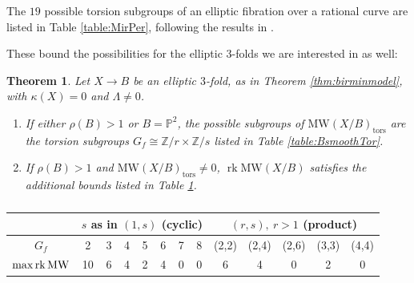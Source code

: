 \documentclass[11pt]{amsart}
\newtheorem{theorem}{Theorem}[section]
\theoremstyle{definition}
\theoremstyle{definition}
\theoremstyle{remark}
\theoremstyle{remark}
\theoremstyle{definition}
\theoremstyle{conjecture}
\newcommand{\MW}{\mathrm{MW}}
\begin{document}
\smallskip
The $19$ possible torsion subgroups 
of an elliptic fibration over a rational curve
are listed in Table \ref{table:MirPer},
following the results in \cite{MirandaPersson1989}.
\begin{table}[h]
\caption{}\label{table:MirPer}
\centering
{}
\end{table}

These bound the possibilities for the elliptic $3$-folds we are interested in as well:

 \begin{theorem}\label{thm:TorsionCY3}
 Let  $X \to B$  be an elliptic $3$-fold, 
 as in Theorem \ref{thm:birminmodel},
 with $\kappa(X)=0$
 and $\Lambda \neq 0$.
 
 \begin{enumerate}
\item If either  \( \rho(B)>1 \) or $B = {\mathbb P}^2$, 
the possible subgroups of $\MW(X/B)_{\mathrm{tors}}$ 
are the torsion subgroups  $ G_f \cong \mathbb{Z}/r \times \mathbb{Z}/s$ listed in Table \ref{table:BsmoothTor}.

\item  If  \( \rho(B)>1 \)  and $\MW(X/B)_{\mathrm{tors}} \neq 0$, $\operatorname{rk} \MW(X/B)$ satisfies the additional bounds
listed in Table \ref{table:NonZeroTor1}.
\end{enumerate}
 \end{theorem}
 
\begin{table}[h]
\caption{}\label{table:BsmoothTor}
\centering
{}
\end{table}


\begin{table}[h]
\caption{}\label{table:NonZeroTor1}
\centering
\begin{tabular}{|c|c|c|c|c|c|c|c||c|c|c|c|c|}
\hline
 & \multicolumn{7}{c||}{$s$ as in $(1,s)$ (cyclic) } & \multicolumn{5}{c|}{$(r,s),\ r>1$ (product) } \\
\hline
$G_f$ 
& 2 & 3 & 4 & 5 & 6 & 7 & 8 
& (2,2) & (2,4) & (2,6) & (3,3) & (4,4) \\
\hline
$\max \operatorname{rk}{\rm MW}$ 
& 10 & 6 & 4 & 2 & 4 & 0 & 0 
& 6 & 4 & 0 & 2 & 0 \\
\hline
\end{tabular}
\end{table}
\end{document}
